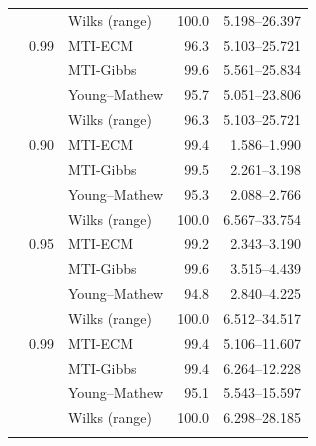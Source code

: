 \begin{longtable}{@{}rrlrr@{}}
 &  & Wilks (range) & 100.0 & 5.198--26.397 \\
\addlinespace[0.3em]
500 & 0.99 & MTI-ECM & 96.3 & 5.103--25.721 \\
 &  & MTI-Gibbs & 99.6 & 5.561--25.834 \\
 &  & Young--Mathew & 95.7 & 5.051--23.806 \\
 &  & Wilks (range) & 96.3 & 5.103--25.721 \\
\addlinespace[0.3em]
1000 & 0.90 & MTI-ECM & 99.4 & 1.586--1.990 \\
 &  & MTI-Gibbs & 99.5 & 2.261--3.198 \\
 &  & Young--Mathew & 95.3 & 2.088--2.766 \\
 &  & Wilks (range) & 100.0 & 6.567--33.754 \\
\addlinespace[0.3em]
1000 & 0.95 & MTI-ECM & 99.2 & 2.343--3.190 \\
 &  & MTI-Gibbs & 99.6 & 3.515--4.439 \\
 &  & Young--Mathew & 94.8 & 2.840--4.225 \\
 &  & Wilks (range) & 100.0 & 6.512--34.517 \\
\addlinespace[0.3em]
1000 & 0.99 & MTI-ECM & 99.4 & 5.106--11.607 \\
 &  & MTI-Gibbs & 99.4 & 6.264--12.228 \\
 &  & Young--Mathew & 95.1 & 5.543--15.597 \\
 &  & Wilks (range) & 100.0 & 6.298--28.185 \\
\addlinespace[0.3em]
\end{longtable}
\endgroup
